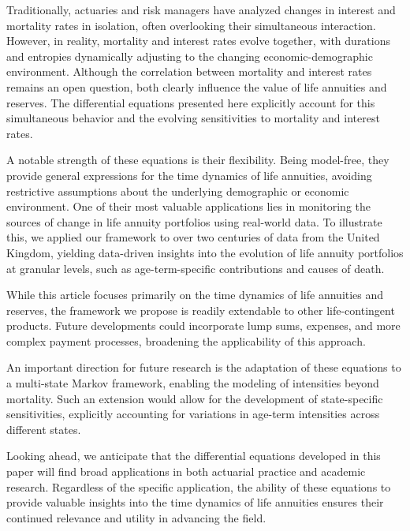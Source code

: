 \documentclass[12pt]{article}
\begin{document}
Traditionally, actuaries and risk managers have analyzed changes in interest and mortality rates in isolation, often overlooking their simultaneous interaction. However, in reality, mortality and interest rates evolve together, with durations and entropies dynamically adjusting to the changing economic-demographic environment. Although the correlation between mortality and interest rates remains an open question, both clearly influence the value of life annuities and reserves. The differential equations presented here explicitly account for this simultaneous behavior and the evolving sensitivities to mortality and interest rates.

A notable strength of these equations is their flexibility. Being model-free, they provide general expressions for the time dynamics of life annuities, avoiding restrictive assumptions about the underlying demographic or economic environment. One of their most valuable applications lies in monitoring the sources of change in life annuity portfolios using real-world data. To illustrate this, we applied our framework to over two centuries of data from the United Kingdom, yielding data-driven insights into the evolution of life annuity portfolios at granular levels, such as age-term-specific contributions and causes of death.

While this article focuses primarily on the time dynamics of life annuities and reserves, the framework we propose is readily extendable to other life-contingent products. Future developments could incorporate lump sums, expenses, and more complex payment processes, broadening the applicability of this approach.

An important direction for future research is the adaptation of these equations to a multi-state Markov framework, enabling the modeling of intensities beyond mortality. Such an extension would allow for the development of state-specific sensitivities, explicitly accounting for variations in age-term intensities across different states.

Looking ahead, we anticipate that the differential equations developed in this paper will find broad applications in both actuarial practice and academic research. Regardless of the specific application, the ability of these equations to provide valuable insights into the time dynamics of life annuities ensures their continued relevance and utility in advancing the field.

\newpage


%
%
\end{document}
